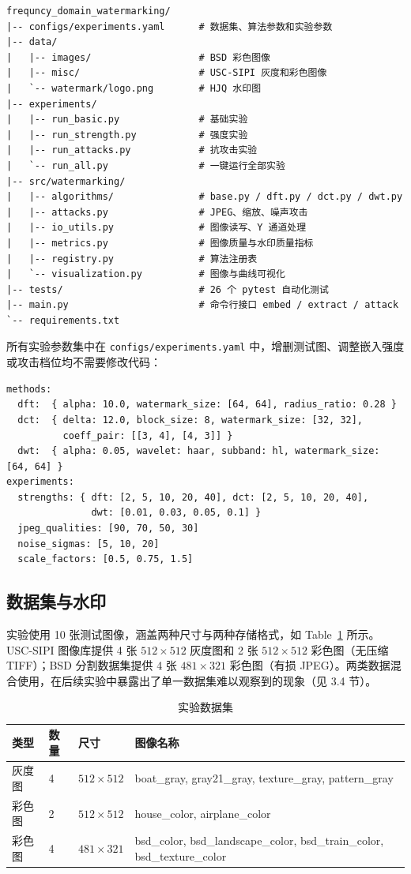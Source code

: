 \documentclass[11pt]{ctexart}
\begin{document}
\begin{lstlisting}
frequncy_domain_watermarking/
|-- configs/experiments.yaml      # 数据集、算法参数和实验参数
|-- data/
|   |-- images/                   # BSD 彩色图像
|   |-- misc/                     # USC-SIPI 灰度和彩色图像
|   `-- watermark/logo.png        # HJQ 水印图
|-- experiments/
|   |-- run_basic.py              # 基础实验
|   |-- run_strength.py           # 强度实验
|   |-- run_attacks.py            # 抗攻击实验
|   `-- run_all.py                # 一键运行全部实验
|-- src/watermarking/
|   |-- algorithms/               # base.py / dft.py / dct.py / dwt.py
|   |-- attacks.py                # JPEG、缩放、噪声攻击
|   |-- io_utils.py               # 图像读写、Y 通道处理
|   |-- metrics.py                # 图像质量与水印质量指标
|   |-- registry.py               # 算法注册表
|   `-- visualization.py          # 图像与曲线可视化
|-- tests/                        # 26 个 pytest 自动化测试
|-- main.py                       # 命令行接口 embed / extract / attack
`-- requirements.txt
\end{lstlisting}

所有实验参数集中在 \texttt{configs/experiments.yaml} 中，增删测试图、调整嵌入强度或攻击档位均不需要修改代码：

\begin{lstlisting}
methods:
  dft:  { alpha: 10.0, watermark_size: [64, 64], radius_ratio: 0.28 }
  dct:  { delta: 12.0, block_size: 8, watermark_size: [32, 32],
          coeff_pair: [[3, 4], [4, 3]] }
  dwt:  { alpha: 0.05, wavelet: haar, subband: hl, watermark_size: [64, 64] }
experiments:
  strengths: { dft: [2, 5, 10, 20, 40], dct: [2, 5, 10, 20, 40],
               dwt: [0.01, 0.03, 0.05, 0.1] }
  jpeg_qualities: [90, 70, 50, 30]
  noise_sigmas: [5, 10, 20]
  scale_factors: [0.5, 0.75, 1.5]
\end{lstlisting}

\subsection{数据集与水印}

实验使用 10 张测试图像，涵盖两种尺寸与两种存储格式，如 Table~\ref{tab:dataset} 所示。USC-SIPI 图像库提供 4 张 $512\times512$ 灰度图和 2 张 $512\times512$ 彩色图（无压缩 TIFF）；BSD 分割数据集提供 4 张 $481\times321$ 彩色图（有损 JPEG）。两类数据混合使用，在后续实验中暴露出了单一数据集难以观察到的现象（见 3.4 节）。

\begin{table}[H]
  \centering
  \caption{实验数据集}
  \label{tab:dataset}
  \begin{tabular}{llll}
    \toprule
    类型 & 数量 & 尺寸 & 图像名称 \\
    \midrule
    灰度图 & 4 & $512\times512$ & boat\_gray, gray21\_gray, texture\_gray, pattern\_gray \\
    彩色图 & 2 & $512\times512$ & house\_color, airplane\_color \\
    彩色图 & 4 & $481\times321$ & bsd\_color, bsd\_landscape\_color, bsd\_train\_color, bsd\_texture\_color \\
    \bottomrule
  \end{tabular}
\end{table}
\end{document}
